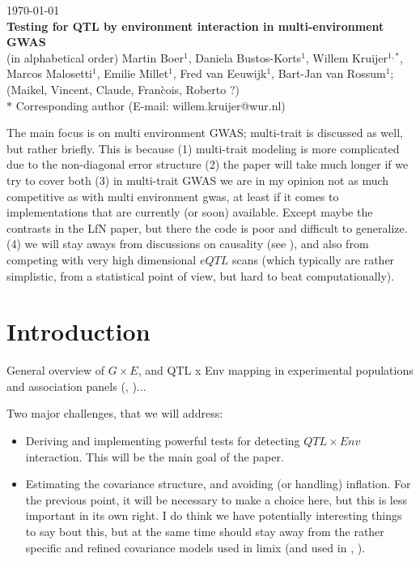 \documentclass[12pt]{article}
\date{}
\title{}
\author{Daniela Bustos-Korts, Emilie Millet, Bart-Jan van Rossum, Martin Boer?, Fred van Eeuwijk, Willem Kruijer}
\begin{document}
	
	\begin{flushleft}
		\today \\
		{\Large
			\textbf{Testing for QTL by environment interaction in multi-environment GWAS}
		}
		\\
		(in alphabetical order) Martin Boer$^{1}$, Daniela Bustos-Korts$^{1}$, Willem Kruijer$^{1, \ast}$, Marcos Malosetti$^{1}$, Emilie Millet$^{1}$, Fred van Eeuwijk$^{1}$, Bart-Jan van Rossum$^{1}$; (Maikel, Vincent, Claude, Fran\`cois, Roberto ?)
		\\
		$\ast$ Corresponding author (E-mail: willem.kruijer@wur.nl)
	\end{flushleft}


The main focus is on multi environment GWAS; multi-trait is discussed as well, but rather briefly. This is because (1) multi-trait modeling is more complicated due to the non-diagonal error structure (2) the paper will take much longer if we try to cover both (3) in multi-trait GWAS we are in my opinion not as much competitive as with multi environment gwas, at least if it comes to implementations that are currently (or soon) available. Except maybe the contrasts in the LfN paper, but there the code is poor and difficult to generalize. (4) we will stay aways from discussions on causality (see \cite{stephens_2013}), and also from competing with very high dimensional  $eQTL$ scans (which typically are rather  simplistic, from a statistical point of view, but hard to beat computationally). 

\section{Introduction}

General overview of $G \times E$, and QTL x Env mapping in experimental populations \cite{boer_etal_2007} and association panels (\cite{korte_etal_2012}, \cite{sasaki_etal_2015_multienv_gwas_Athaliana})...


Two major challenges, that we will address:
%
\begin{itemize}
\item Deriving and implementing powerful tests for detecting $QTL \times Env$ interaction. This will be the main goal of the paper.
	\item Estimating the covariance structure, and avoiding (or handling) inflation. For the previous point, it will be necessary to make a choice here, but this is less important in its own right. I do think we have potentially interesting things to say bout this, but at the same time should stay away from the rather specific and refined covariance models used in limix (and used in \cite{sasaki_etal_2015_multienv_gwas_Athaliana}, \cite{casale_etal_2015_efficientSetTests}).  
\end{itemize}
 
\end{document}
